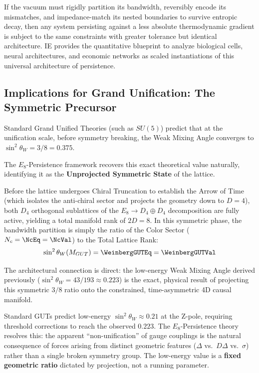 If the vacuum must rigidly partition its bandwidth, reversibly encode its mismatches, and impedance-match its nested boundaries to survive entropic decay, then any system persisting against a less absolute thermodynamic gradient is subject to the same constraints with greater tolerance but identical architecture. IE provides the quantitative blueprint to analyze biological cells, neural architectures, and economic networks as scaled instantiations of this universal architecture of persistence.


\subsection{Implications for Grand Unification: The Symmetric Precursor}

Standard Grand Unified Theories (such as $SU(5)$) predict that at the unification scale, before symmetry breaking, the Weak Mixing Angle converges to $\sin^2 \theta_W = 3/8 = 0.375$.

The $E_8$-Persistence framework recovers this exact theoretical value naturally, identifying it as the \textbf{Unprojected Symmetric State} of the lattice.


Before the lattice undergoes Chiral Truncation to establish the Arrow of Time (which isolates the anti-chiral sector and projects the geometry down to $D=4$), both $D_4$ orthogonal sublattices of the $E_8 \to D_4 \oplus D_4$ decomposition are fully active, yielding a total manifold rank of $2D = 8$. In this symmetric phase, the bandwidth partition is simply the ratio of the Color Sector ($N_c = \NcEq = \NcVal$) to the Total Lattice Rank:
\begin{equation}
    \sin^2 \theta_W(M_{GUT}) = \WeinbergGUTEq = \WeinbergGUTVal
\end{equation}

The architectural connection is direct: the low-energy Weak Mixing Angle derived previously ($\sin^2 \theta_W = 43/193 \approx 0.223$) is the exact, physical result of projecting this symmetric $3/8$ ratio onto the constrained, time-asymmetric 4D causal manifold.

Standard GUTs predict low-energy $\sin^2\theta_W \approx 0.21$ at the Z-pole, requiring threshold corrections to reach the observed $0.223$. The $E_8$-Persistence theory resolves this: the apparent ``non-unification'' of gauge couplings is the natural consequence of forces arising from distinct geometric features ($\Delta$ vs.~$D\Delta$ vs.~$\sigma$) rather than a single broken symmetry group. The low-energy value is a \textbf{fixed geometric ratio} dictated by projection, not a running parameter.


